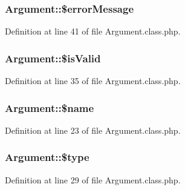 \subsubsection[{\texorpdfstring{\$error\+Message}{$errorMessage}}]{\setlength{\rightskip}{0pt plus 5cm}Argument\+::\$error\+Message}\hypertarget{classArgument_ad0af83b11507626a9c95fd188e60b592}{}\label{classArgument_ad0af83b11507626a9c95fd188e60b592}


Definition at line 41 of file Argument.\+class.\+php.

\subsubsection[{\texorpdfstring{\$is\+Valid}{$isValid}}]{\setlength{\rightskip}{0pt plus 5cm}Argument\+::\$is\+Valid}\hypertarget{classArgument_af1a5d4055fd3e16bea7951843a3bdd92}{}\label{classArgument_af1a5d4055fd3e16bea7951843a3bdd92}


Definition at line 35 of file Argument.\+class.\+php.

\subsubsection[{\texorpdfstring{\$name}{$name}}]{\setlength{\rightskip}{0pt plus 5cm}Argument\+::\$name}\hypertarget{classArgument_ab37a45cb92464255505b2f4f35909da6}{}\label{classArgument_ab37a45cb92464255505b2f4f35909da6}


Definition at line 23 of file Argument.\+class.\+php.

\subsubsection[{\texorpdfstring{\$type}{$type}}]{\setlength{\rightskip}{0pt plus 5cm}Argument\+::\$type}\hypertarget{classArgument_a7a2272bc3d12787f80143fbea01698f4}{}\label{classArgument_a7a2272bc3d12787f80143fbea01698f4}


Definition at line 29 of file Argument.\+class.\+php.

